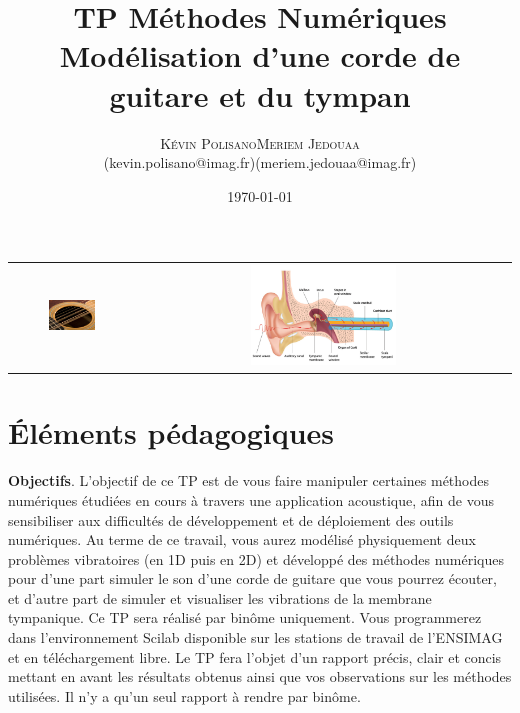 \documentclass[a4,12pt]{article}
\title{\textbf{TP Méthodes Numériques \\ Modélisation d'une corde de guitare et du tympan}}
\author{
\begin{tabular}{cc}
	\textsc{Kévin Polisano} & \textsc{Meriem Jedouaa} \\
	\small (kevin.polisano@imag.fr) & \small  (meriem.jedouaa@imag.fr)
\end{tabular}}
\date{\small \today}
\begin{document}
\maketitle

\begin{center}
	\begin{tabular}{cc} 
		\includegraphics[width=0.4\textwidth]{images/guitare.pdf} & 
		\includegraphics[width=0.4\textwidth]{images/oreille.pdf} 
	\end{tabular}
\end{center}

\section{\'Eléments pédagogiques}

\textbf{Objectifs}. L'objectif de ce TP est de vous faire manipuler certaines méthodes numériques étudiées en cours à travers une application acoustique, afin de vous sensibiliser aux difficultés de développement et de déploiement des outils numériques. Au terme de ce travail, vous aurez modélisé physiquement deux problèmes vibratoires (en 1D puis en 2D) et développé des méthodes numériques pour d'une part simuler le son d'une corde de guitare que vous pourrez écouter, et d'autre part de simuler et visualiser les vibrations de la membrane tympanique.
Ce TP sera réalisé par binôme uniquement. Vous programmerez dans l’environnement Scilab disponible sur les stations de travail de l'ENSIMAG et en téléchargement libre. Le TP fera l’objet d’un rapport précis, clair et concis mettant en avant les résultats obtenus ainsi que vos observations sur les méthodes utilisées. Il n'y a qu'un seul rapport à rendre par binôme.\\
\end{document}
